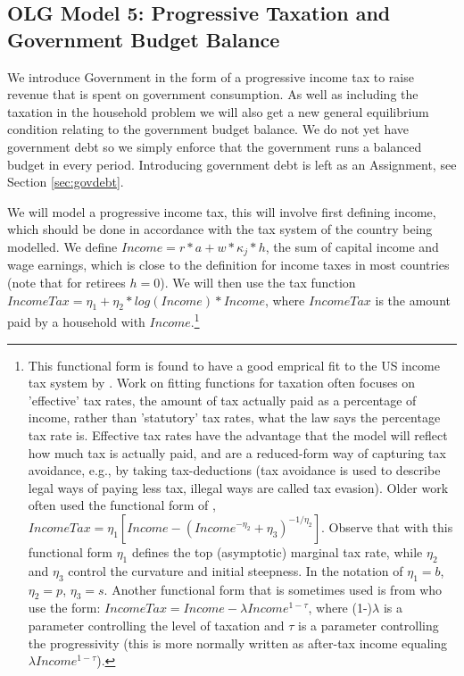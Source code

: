 \subsection{OLG Model 5: Progressive Taxation and Government Budget Balance}
We introduce Government in the form of a progressive income tax to raise revenue that is spent on government consumption. As well as including the taxation in the household problem we will also get a new general equilibrium condition relating to the government budget balance. We do not yet have government debt so we simply enforce that the government runs a balanced budget in every period. Introducing government debt is left as an Assignment, see Section \ref{sec:govdebt}.

We will model a progressive income tax, this will involve first defining income, which should be done in accordance with the tax system of the country being modelled. We define $Income=r*a+w*\kappa_j*h$, the sum of capital income and wage earnings, which is close to the definition for income taxes in most countries (note that for retirees $h=0$). We will then use the tax function $IncomeTax=\eta_1+\eta_2*log(Income)*Income$, where $IncomeTax$ is the amount paid by a household with $Income$.\footnote{This functional form is found to have a good emprical fit to the US income tax system by \cite*{GunerKaygusuvVentura2014}. Work on fitting functions for taxation often focuses on 'effective' tax rates, the amount of tax actually paid as a percentage of income, rather than 'statutory' tax rates, what the law says the percentage tax rate is. Effective tax rates have the advantage that the model will reflect how much tax is actually paid, and are a reduced-form way of capturing tax avoidance, e.g., by taking tax-deductions (tax avoidance is used to describe legal ways of paying less tax, illegal ways are called tax evasion). Older work often used the functional form of \cite*{GouveiaStrauss1994,GouveiaStrauss1999}, $IncomeTax = \eta_1 \left[Income-(Income^{-\eta_2}+\eta_3)^{-1/\eta_2}\right]$. Observe that with this functional form $\eta_1$ defines the top (asymptotic) marginal tax rate, while $\eta_2$ and $\eta_3$ control the curvature and initial steepness. In the notation of \cite*{GouveiaStrauss1999} $\eta_1=b$, $\eta_2=p$, $\eta_3=s$. Another functional form that is sometimes used is from \cite*{HeathcoteStoreslettenViolante2014} who use the form: $IncomeTax=Income-\lambda Income^{1-\tau}$, where (1-)$\lambda$ is a parameter controlling the level of taxation and $\tau$ is a parameter controlling the progressivity (this is more normally written as after-tax income equaling $\lambda Income^{1-\tau}$).}

